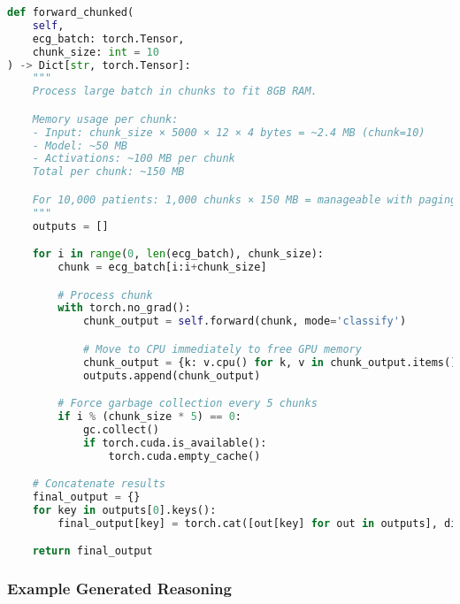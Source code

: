 \documentclass[11pt]{article}
\begin{document}
\begin{lstlisting}[language=Python, caption=Chunked Inference for Large Datasets]
def forward_chunked(
    self,
    ecg_batch: torch.Tensor,
    chunk_size: int = 10
) -> Dict[str, torch.Tensor]:
    """
    Process large batch in chunks to fit 8GB RAM.

    Memory usage per chunk:
    - Input: chunk_size × 5000 × 12 × 4 bytes = ~2.4 MB (chunk=10)
    - Model: ~50 MB
    - Activations: ~100 MB per chunk
    Total per chunk: ~150 MB

    For 10,000 patients: 1,000 chunks × 150 MB = manageable with paging
    """
    outputs = []

    for i in range(0, len(ecg_batch), chunk_size):
        chunk = ecg_batch[i:i+chunk_size]

        # Process chunk
        with torch.no_grad():
            chunk_output = self.forward(chunk, mode='classify')

            # Move to CPU immediately to free GPU memory
            chunk_output = {k: v.cpu() for k, v in chunk_output.items()}
            outputs.append(chunk_output)

        # Force garbage collection every 5 chunks
        if i % (chunk_size * 5) == 0:
            gc.collect()
            if torch.cuda.is_available():
                torch.cuda.empty_cache()

    # Concatenate results
    final_output = {}
    for key in outputs[0].keys():
        final_output[key] = torch.cat([out[key] for out in outputs], dim=0)

    return final_output
\end{lstlisting}

\subsubsection{Example Generated Reasoning}
\end{document}

